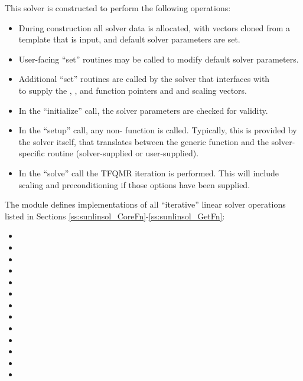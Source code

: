 This solver is constructed to perform the following operations:
\begin{itemize}
\item During construction all {\nvector} solver data is allocated,
  with vectors cloned from a template {\nvector} that is input, and
  default solver parameters are set.
\item User-facing ``set'' routines may be called to modify default
  solver parameters.
\item Additional ``set'' routines are called by the {\sundials} solver
  that interfaces with \\ \noindent {\sunlinsolsptfqmr} to supply the
  , , and  function pointers and
   and  scaling vectors.
\item In the ``initialize'' call, the solver parameters are checked
  for validity.
\item In the ``setup'' call, any non-
   function is called.  Typically, this is provided by
  the {\sundials} solver itself, that translates between the
  generic  function and the
  solver-specific routine (solver-supplied or user-supplied).
\item In the ``solve'' call the TFQMR iteration is performed.  This
  will include scaling and preconditioning if those options have been
  supplied.
\end{itemize}


\noindent The {\sunlinsolsptfqmr} module defines implementations of all
``iterative'' linear solver operations listed in Sections
\ref{ss:sunlinsol_CoreFn}-\ref{ss:sunlinsol_GetFn}:
\begin{itemize}
\item {}
\item {}
\item {}
\item {}
\item {}
\item {}
\item {}
\item {}
\item {}
\item {}
\item {}
\item {}
\item {}
\end{itemize}
